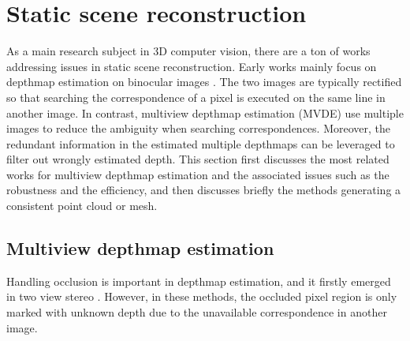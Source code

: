
\section{Static scene reconstruction}
As a main research subject in 3D computer vision, there are a ton of works addressing issues in static scene reconstruction. Early works mainly focus on depthmap estimation on binocular images \cite{boykov2001fast,Sun_ECCV2002_stereoBeliefProp,scharstein2002taxonomy,scharstein2007learning}. The two images are typically rectified so that searching the correspondence of a pixel is executed on the same line in another image. In contrast, multiview depthmap estimation (MVDE) use multiple images to reduce the ambiguity when searching correspondences. Moreover, the redundant information in the estimated multiple depthmaps can be leveraged to filter out wrongly estimated depth. %
This section first discusses the most related works for multiview depthmap estimation and the associated issues such as the robustness and the efficiency, and then discusses briefly the methods generating a consistent point cloud or mesh.

\subsection{Multiview depthmap estimation}
Handling occlusion is important in depthmap estimation, and it firstly emerged in two view stereo \cite{Sun_ECCV2002_stereoBeliefProp, Sun_CVPR2005_stereo, Xiao:2008}. However, in these methods, the occluded pixel region is only marked with unknown depth due to the unavailable correspondence in another image. 

